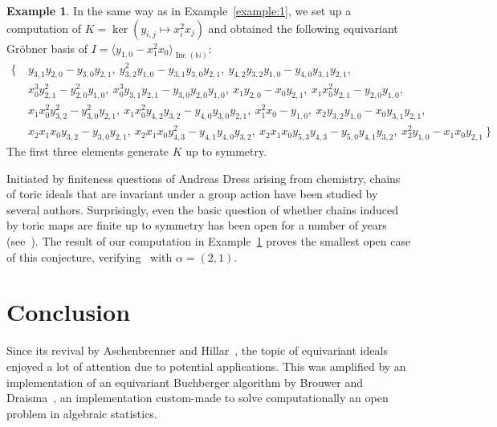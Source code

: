 \documentclass[10pt]{amsart}
\theoremstyle{definition}
\newtheorem{example}[theorem]{Example}
\theoremstyle{remark}
\numberwithin{equation}{section}
\newcommand{\B}[1]{\mathbb #1}
\newcommand{\<}{\langle}
\renewcommand{\>}{\rangle}
\newcommand{\ideal}[1]{\langle #1 \rangle}
\newcommand{\Inc}{\operatorname{Inc}(\B N)}
\begin{document}
\begin{example}\label{example:2}
In the same way as in Example~\ref{example:1}, we set up a computation of $K = \ker(y_{i,j} \mapsto x_i^2x_j)$ and obtained the following equivariant Gr\"obner basis of $I = \ideal{y_{1,0} - x_1^2x_0}_{\Inc}$:
\begin{align*}
\{\  &{y}_{3,1} {y}_{2,0}-{y}_{3,0} {y}_{2,1},\ {y}_{3,2}^{2} {y}_{1,0}-{y}_{3,1} {y}_{3,0} {y}_{2,1},\ {y}_{4,2} {y}_{3,2} {y}_{1,0}-{y}_{4,0} {y}_{3,1} {y}_{2,1},
\\ 
& {x}_{0}^{3} {y}_{2,1}^{2}-{y}_{2,0}^{2} {y}_{1,0},\ {x}_{0}^{3} {y}_{3,1} {y}_{2,1}-{y}_{3,0} {y}_{2,0} {y}_{1,0},\ {x}_{1} {y}_{2,0}-{x}_{0} {y}_{2,1},\ {x}_{1} {x}_{0}^{2} {y}_{2,1}-{y}_{2,0} {y}_{1,0},\\
&      {x}_{1} {x}_{0}^{2} {y}_{3,2}^{2}-{y}_{3,0}^{2} {y}_{2,1},\ {x}_{1} {x}_{0}^{2} {y}_{4,2} {y}_{3,2}-{y}_{4,0} {y}_{3,0} {y}_{2,1},\ {x}_{1}^{2} {x}_{0}-{y}_{1,0},\ {x}_{2} {y}_{3,2} {y}_{1,0}-{x}_{0} {y}_{3,1} {y}_{2,1},\ \\
& {x}_{2} {x}_{1} {x}_{0} {y}_{3,2}-{y}_{3,0} {y}_{2,1},\ {x}_{2} {x}_{1} {x}_{0} {y}_{4,3}^{2}-{y}_{4,1} {y}_{4,0} {y}_{3,2},\ {x}_{2} {x}_{1} {x}_{0} {y}_{5,3} {y}_{4,3}-{y}_{5,0} {y}_{4,1} {y}_{3,2},\ {x}_{2}^{2} {y}_{1,0}-{x}_{1} {x}_{0} {y}_{2,1}\ \}
\end{align*}
The first three elements generate $K$ up to symmetry.
\end{example}

Initiated by finiteness questions of Andreas Dress arising from chemistry, chains of toric ideals that are invariant under a group action have been studied by several authors.  Surprisingly, even the basic question of whether chains induced by toric maps are finite up to symmetry has been open for a number of years (see~\cite[Conjecture 5.10]{Aschenbrenner-Hillar:finite-generation}). The result of our computation in Example~\ref{example:2} proves the smallest open case of this conjecture, verifying~\cite[Conjecture 37]{Hillar-Martin-del-Campo} with $\alpha = (2,1)$.

\section{Conclusion}
Since its revival by Aschenbrenner and Hillar~\cite{Aschenbrenner-Hillar:finite-generation}, the topic of equivariant ideals enjoyed a lot of attention due to potential applications. This was amplified by an  implementation of an equivariant Buchberger algorithm by Brouwer and Draisma~\cite{Brouwer-Draisma}, an implementation custom-made to solve computationally an open problem in algebraic statistics.
\end{document}
